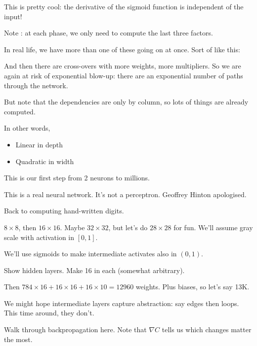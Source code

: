 This is pretty cool: the derivative of the sigmoid function is independent of the input!

Note : at each phase, we only need to compute the last three factors.



In real life, we have more than one of these going on at once.  Sort of like this:



And then there are cross-overs with more weights, more multipliers.
So we are again at risk of exponential blow-up: there are an
exponential number of paths through the network.

But note that the dependencies are only by column, so lots of things
are already computed.

In other words,
\begin{itemize}
\item Linear in depth
\item Quadratic in width
\end{itemize}



This is our first step from 2 neurons to millions.

This is a real neural network.  It's not a perceptron.  Geoffrey Hinton apologised.

Back to computing hand-written digits.

$8\times 8$, then $16\times 16$.  Maybe $32\times 32$, but let's do
$28\times 28$ for fun.  We'll assume gray scale with activation in
$[0,1]$.

We'll use sigmoids to make intermediate activates also in $(0,1)$.

Show hidden layers.  Make 16 in each (somewhat arbitrary).

Then $784\times 16 + 16\times 16 + 16 \times 10 = 12960$ weights.
Plus biases, so let's say 13K.

We might hope intermediate layers capture abstraction: say edges then
loops.  This time around, they don't.

Walk through backpropagation here.  Note that $\nabla C$ tells us
which changes matter the most.

